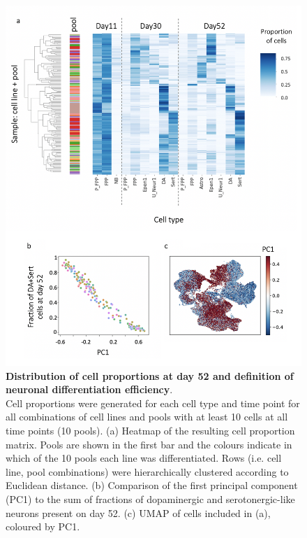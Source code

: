 \begin{figure}[htbp]
\centering
\includegraphics[width=14cm]{Chapter5/Fig/neuroseq_define_diff_efficiency.png}
\caption[Definition of neuronal differentiation efficiency]{\textbf{Distribution of cell proportions at day 52 and definition of neuronal differentiation efficiency}.\\
Cell proportions were generated for each cell type and time point for all combinations of cell lines and pools with at least 10 cells at all time points (10 pools). 
(a) Heatmap of the resulting cell proportion matrix. 
Pools are shown in the first bar and the colours indicate in which of the 10 pools each line was differentiated. 
Rows (i.e. cell line, pool combinations) were hierarchically clustered according to Euclidean distance. 
(b) Comparison of the first principal component (PC1) to the sum of fractions of dopaminergic and serotonergic-like neurons present on day 52.
(c) UMAP of cells included in (a), coloured by PC1.}
\label{fig:neuroseq_diff_efficiency}
\end{figure}

\clearpage

